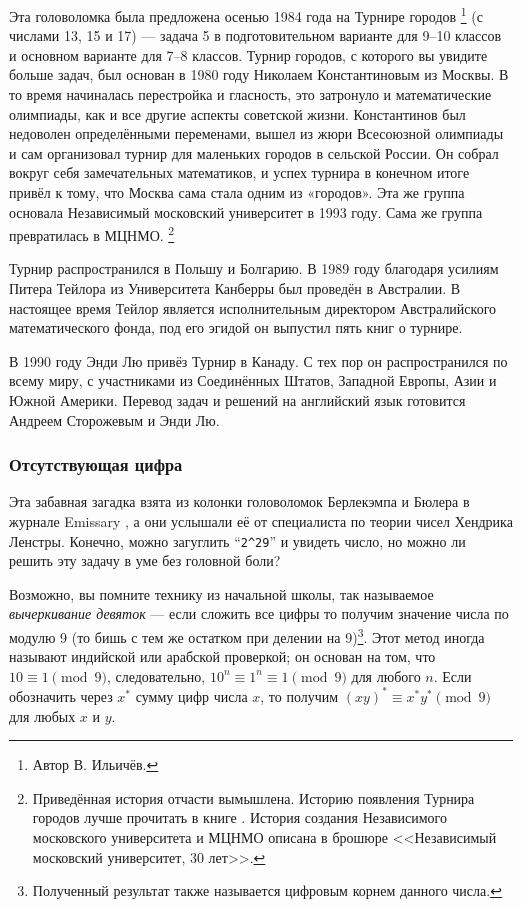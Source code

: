 Эта головоломка была предложена осенью 1984 года на Турнире городов%
\footnote{Автор В. Ильичёв.\pr} (с числами 13, 15 и 17) --- задача 5 в подготовительном варианте для 9--10 классов и основном варианте для 7--8 классов.
Турнир городов, с которого вы увидите больше задач, был основан в 1980 году Николаем Константиновым из Москвы.
В то время начиналась перестройка и гласность, это затронуло и математические олимпиады, как и все другие аспекты советской жизни.
Константинов был недоволен определёнными переменами, вышел из жюри Всесоюзной олимпиады и сам организовал турнир для маленьких городов в сельской России.
Он собрал вокруг себя замечательных математиков, и успех турнира в конечном итоге привёл к тому, что Москва сама стала одним из «городов».
Эта же группа основала Независимый московский университет в 1993 году.
Сама же группа превратилась в МЦНМО.%
\footnote{Приведённая история отчасти вымышлена. Историю появления Турнира городов лучше прочитать в книге  \cite{Tolpzgo2010}. История создания Независимого московского университета и МЦНМО описана в брошюре <<Независимый московский университет, 30 лет>>. \pr}

Турнир распространился в Польшу и Болгарию.
В 1989 году благодаря усилиям Питера Тейлора из Университета Канберры был проведён в Австралии.
В настоящее время Тейлор является исполнительным директором Австралийского математического фонда, под его эгидой он выпустил пять книг о турнире.

В 1990 году Энди Лю привёз Турнир в Канаду.
С тех пор он распространился по всему миру, с участниками из Соединённых Штатов, Западной Европы, Азии и Южной Америки.
Перевод задач и решений на английский язык готовится Андреем Сторожевым и Энди Лю.

\subsubsection*{Отсутствующая цифра}

Эта забавная загадка взята из колонки головоломок Берлекэмпа и Бюлера в журнале Emissary \cite[весна/осень 2006 года]{3},
а они услышали её от специалиста по теории чисел Хендрика Ленстры.
Конечно, можно загуглить ``\texttt{2\^{}29}'' и увидеть число, но можно ли решить эту задачу в уме без головной боли?

Возможно, вы помните технику из начальной школы, так называемое \emph{вычеркивание девяток} --- если сложить все цифры то получим значение числа по модулю 9 (то бишь с тем же остатком при делении на 9)\footnote{Полученный результат также называется цифровым корнем данного числа. \pr}.
Этот метод иногда называют индийской или арабской проверкой;
он основан на том, что $10 \equiv 1 \pmod 9$, следовательно, $10^n \equiv 1^n \equiv 1 \pmod 9$ для любого $n$.
Если обозначить через $x^*$ сумму цифр числа $x$, то получим $(xy)^* \equiv x^* y^* \pmod 9$ для любых $x$ и $y$.

